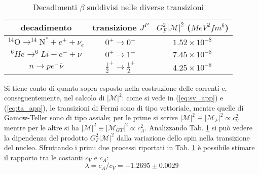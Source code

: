 \documentclass{subnucbo}
\begin{document}
\begin{table}
        \centering
        \begin{tabular}{c  c  c}
                \hline
                decadimento & transizione $J^{P}$ & $G _ { F } ^ { 2 } | \mathcal { M } | ^ { 2 }$ ($MeV^{2}fm^{6}$) \\
                \hline
                $^ { 14 } \mathrm { O } \rightarrow ^ { 14 } \mathrm { N } ^ { * } + e ^ { + } + \nu _ { e }$ & $0 ^ { + } \rightarrow 0 ^ { + }$ & $1.52 \times 10 ^ { - 8 }$ \\
                $^{6}H e \rightarrow^ { 6 } L i + e ^ { - } + \overline { \nu }$ & $0^{+} \rightarrow 1^{+}$ & $7.45 \times 10 ^ { - 8 }$ \\
                $n \rightarrow p e ^ { - } \overline { \nu }$ & $\frac { 1 } { 2 }^{+} \rightarrow \frac { 1 } { 2 } ^ { + }$ & $4.25 \times 10 ^ { - 8 }$ \\
                \hline
        \end{tabular}
        \caption{Decadimenti $\beta$ suddivisi nelle diverse transizioni}
        \label{tab:beta_decays}
\end{table}
Si tiene conto di quanto sopra esposto nella costruzione delle correnti e, conseguentemente, nel calcolo di $|\mathcal{M}|^{2}$: come si vede in (\ref{eq:sv_app}) e (\ref{eq:ta_app}), le transizioni di Fermi sono di tipo vettoriale, mentre quelle di Gamow-Teller sono di tipo assiale; per le prime si scrive $| \mathcal { M } | ^ { 2 } \equiv \left| \mathcal { M } _ { F } \right| ^ { 2 } \propto c _ { V } ^ { 2 }$ mentre per le altre si ha $| \mathcal { M } | ^ { 2 } \equiv \left| \mathcal { M } _ { G T } \right| ^ { 2 } \propto c _ { A } ^ { 2 }$. Analizzando Tab. \ref{tab:beta_decays} si può vedere la dipendenza del prodotto $G_{F}^{2}|\mathcal{M}|^{2}$ dalla variazione dello spin nella transizione del nucleo.
Sfruttando i primi due processi riportati in Tab. \ref{tab:beta_decays} è possibile stimare \cite{ref:BGSex} il rapporto tra le costanti $c_{V}$ e $c_{A}$:
\begin{equation}
        \lambda = c _ { A } / c _ { V } = - 1.2695 \pm 0.0029
        \label{eq:ca_cv}
\end{equation}
\end{document}
